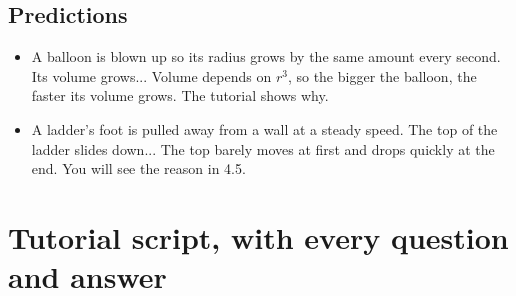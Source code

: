 \documentclass[11pt]{article}
\begin{document}
\subsection*{Predictions}\begin{itemize}
\item A balloon is blown up so its radius grows by the same amount every second. Its volume grows...  Volume depends on $r^3$, so the bigger the balloon, the faster its volume grows. The tutorial shows why.
\item A ladder's foot is pulled away from a wall at a steady speed. The top of the ladder slides down...  The top barely moves at first and drops quickly at the end. You will see the reason in 4.5.
\end{itemize}
\section*{Tutorial script, with every question and answer}
\end{document}
